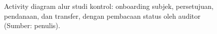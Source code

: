 

\begin{figure}[p]
\centering
\resizebox{\textwidth}{!}{}
\caption{Activity diagram alur studi kontrol: onboarding subjek, persetujuan, pendanaan, dan transfer, dengan pembacaan status oleh auditor (Sumber: penulis).}
\label{fig:ch3-ad-07}
\end{figure}
